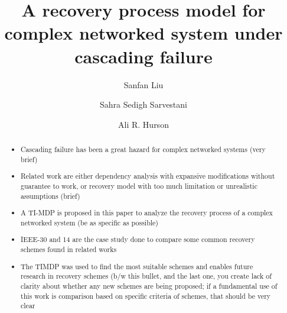 \documentclass[runningheads]{llncs}
\begin{document}
%

\title{A recovery process model for complex networked system under cascading failure}
%
%
\author{Sanfan Liu \and
Sahra Sedigh Sarvestani \and
Ali R. Hurson}
%
%

%
\maketitle              %
%
\begin{abstract}
\begin{itemize}
    \item Cascading failure has been a great hazard for complex networked systems  (very brief)
    \item Related work are either dependency analysis with expansive modifications without guarantee to work, or recovery model with too much limitation or unrealistic assumptions (brief)
    \item A TI-MDP is proposed in this paper to analyze the recovery process of a complex networked system (be as specific as possible)
    \item IEEE-30 and 14 are the case study done to compare some common recovery schemes found in related works
    \item The TIMDP was used to find the most suitable schemes and enables future research in recovery schemes (b/w this bullet, and the last one, you create lack of clarity about whether any new schemes are being proposed; if a fundamental use of this work is comparison based on specific criteria of schemes, that should be very clear 
\end{itemize}
\end{abstract}
\end{document}
